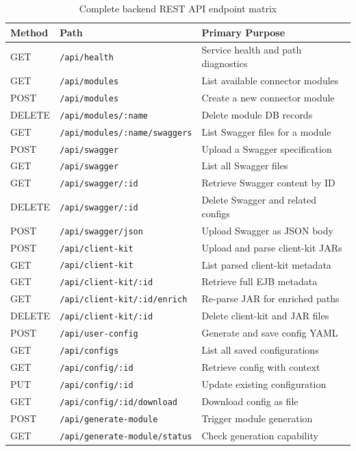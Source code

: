 \begin{table}[H]
\centering
\small
\begin{tabular}{|l|l|p{5.5cm}|}
\hline
\textbf{Method} & \textbf{Path} & \textbf{Primary Purpose} \\
\hline
GET & \texttt{/api/health} & Service health and path diagnostics \\
\hline
GET & \texttt{/api/modules} & List available connector modules \\
\hline
POST & \texttt{/api/modules} & Create a new connector module \\
\hline
DELETE & \texttt{/api/modules/:name} & Delete module DB records \\
\hline
GET & \texttt{/api/modules/:name/\allowbreak swaggers} & List Swagger files for a module \\
\hline
POST & \texttt{/api/swagger} & Upload a Swagger specification \\
\hline
GET & \texttt{/api/swagger} & List all Swagger files \\
\hline
GET & \texttt{/api/swagger/:id} & Retrieve Swagger content by ID \\
\hline
DELETE & \texttt{/api/swagger/:id} & Delete Swagger and related configs \\
\hline
POST & \texttt{/api/swagger/json} & Upload Swagger as JSON body \\
\hline
POST & \texttt{/api/client-kit} & Upload and parse client-kit JARs \\
\hline
GET & \texttt{/api/client-kit} & List parsed client-kit metadata \\
\hline
GET & \texttt{/api/client-kit/:id} & Retrieve full EJB metadata \\
\hline
GET & \texttt{/api/client-kit/:id/\allowbreak enrich} & Re-parse JAR for enriched paths \\
\hline
DELETE & \texttt{/api/client-kit/:id} & Delete client-kit and JAR files \\
\hline
POST & \texttt{/api/user-config} & Generate and save config YAML \\
\hline
GET & \texttt{/api/configs} & List all saved configurations \\
\hline
GET & \texttt{/api/config/:id} & Retrieve config with context \\
\hline
PUT & \texttt{/api/config/:id} & Update existing configuration \\
\hline
GET & \texttt{/api/config/:id/\allowbreak download} & Download config as file \\
\hline
POST & \texttt{/api/generate-module} & Trigger module generation \\
\hline
GET & \texttt{/api/generate-module/\allowbreak status} & Check generation capability \\
\hline
\end{tabular}
\caption{Complete backend REST API endpoint matrix}
\label{tab:appendix_endpoints}
\end{table}

